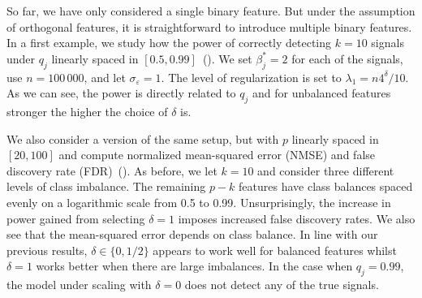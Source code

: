 So far, we have only considered a single binary feature. But under the assumption of
orthogonal features, it is straightforward to introduce multiple binary features. In a
first example, we study how the power of correctly detecting \(k=10\) signals under \(q_j\)
linearly spaced in \([0.5, 0.99]\)~(). We set \(\beta^*_j = 2\) for
each of the signals, use \(n = 100\,000\), and let \(\sigma_\varepsilon = 1\). The level of
regularization is set to \(\lambda_1 = n 4^\delta/10\). As we can see, the power is
directly related to \(q_j\) and for unbalanced features stronger the higher the choice of
\(\delta\) is.

We also consider a version of the same setup, but with \(p\) linearly spaced in \([20,
    100]\) and compute normalized mean-squared error (NMSE) and false discovery rate
(FDR)~(). As before, we let \(k = 10\) and consider three
different levels of class imbalance. The remaining \(p-k\) features have class balances
spaced evenly on a logarithmic scale from 0.5 to 0.99. Unsurprisingly, the increase in
power gained from selecting \(\delta = 1\) imposes increased false discovery rates. We also
see that the mean-squared error depends on class balance. In line with our previous
results, \(\delta \in \{0, 1/2\}\) appears to work well for balanced features whilst
\(\delta = 1\) works better when there are large imbalances. In the case when \(q_j =
0.99\), the model under scaling with \(\delta = 0\) does not detect any of the true
signals.

